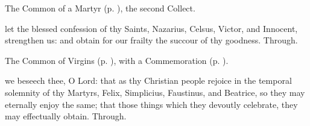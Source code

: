 \clearpage
{}

\begin{rubric}
	The Common of a Martyr (p. \pageref{CommonMartyrNotBishopCollect}), the second Collect.
\end{rubric}




\memorialCollect
{} let the blessed confession of thy Saints, Nazarius, Celsus, Victor, and Innocent, strengthen us: and obtain for our frailty the succour of thy goodness. Through.


\vspace{-0.25\baselineskip}


\begin{rubric}
	The Common of Virgins (p. \pageref{VirginOnlyCollect}), with a Commemoration  (p. \pageref{FelixEtc}).
\end{rubric}


\vspace{-0.25\baselineskip}

\label{FelixEtc}

\memorialCollect
{} we beseech thee, O Lord: that as thy Christian people rejoice in the temporal solemnity of thy Martyrs, Felix, Simplicius, Faustinus, and Beatrice, so they may eternally enjoy the same; that those things which they devoutly celebrate, they may effectually obtain. Through.


\vspace{-0.25\baselineskip}


